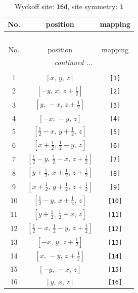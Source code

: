 \documentclass[fleqn,8pt]{jsarticle}
\begin{document}
\begin{longtable}{ccc}
\caption{Wyckoff site: {\tt 16d}, site symmetry: {\tt 1}}
 \\
 \hline \hline
No. & position & mapping \\ \hline \endfirsthead

\multicolumn{2}{l}{\tablename\ \thetable{}} \\
 \hline \hline
No. & position & mapping \\ \hline \endhead

 \hline \hline
\multicolumn{2}{r}{\footnotesize\it continued ...} \\ \endfoot

 \hline \hline
\multicolumn{2}{r}{} \\ \endlastfoot

1 & $\left[ x,\, y,\, z \right]$ & {\tt [1]} \\ \hline
2 & $\left[ - y,\, x,\, z + \frac{1}{2} \right]$ & {\tt [2]} \\ \hline
3 & $\left[ y,\, - x,\, z + \frac{1}{2} \right]$ & {\tt [3]} \\ \hline
4 & $\left[ - x,\, - y,\, z \right]$ & {\tt [4]} \\ \hline
5 & $\left[ \frac{1}{2} - x,\, y + \frac{1}{2},\, z \right]$ & {\tt [5]} \\ \hline
6 & $\left[ x + \frac{1}{2},\, \frac{1}{2} - y,\, z \right]$ & {\tt [6]} \\ \hline
7 & $\left[ \frac{1}{2} - y,\, \frac{1}{2} - x,\, z + \frac{1}{2} \right]$ & {\tt [7]} \\ \hline
8 & $\left[ y + \frac{1}{2},\, x + \frac{1}{2},\, z + \frac{1}{2} \right]$ & {\tt [8]} \\ \hline
9 & $\left[ x + \frac{1}{2},\, y + \frac{1}{2},\, z + \frac{1}{2} \right]$ & {\tt [9]} \\ \hline
10 & $\left[ \frac{1}{2} - y,\, x + \frac{1}{2},\, z \right]$ & {\tt [10]} \\ \hline
11 & $\left[ y + \frac{1}{2},\, \frac{1}{2} - x,\, z \right]$ & {\tt [11]} \\ \hline
12 & $\left[ \frac{1}{2} - x,\, \frac{1}{2} - y,\, z + \frac{1}{2} \right]$ & {\tt [12]} \\ \hline
13 & $\left[ - x,\, y,\, z + \frac{1}{2} \right]$ & {\tt [13]} \\ \hline
14 & $\left[ x,\, - y,\, z + \frac{1}{2} \right]$ & {\tt [14]} \\ \hline
15 & $\left[ - y,\, - x,\, z \right]$ & {\tt [15]} \\ \hline
16 & $\left[ y,\, x,\, z \right]$ & {\tt [16]} \\
\end{longtable}
\end{document}
